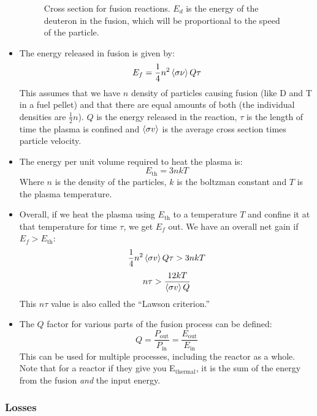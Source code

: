 \documentclass[letter]{article}
\begin{document}
\begin{itemize}
\begin{figure}[hbtp]
    \caption{Cross section for fusion
      reactions. $E_d$ is the energy of the deuteron in the fusion,
      which will be proportional to the speed of the particle.~\cite[pp. 532]{krane}}
    \label{fig:fusion_xsec}
  \end{figure}
\item The energy released in fusion is given by:
  \begin{equation*}
    E_f = \frac{1}{4}n^2\braket{\sigma\nu}Q\tau
  \end{equation*}
This assumes that we have $n$ density of particles causing fusion (like D
and T in a fuel pellet) and that there are equal amounts of both (the
individual densities are $\frac{1}{2}n$). $Q$ is the energy released
in the reaction, $\tau$ is the length of time the plasma is confined
and $\braket{\sigma{}v}$ is the average cross section times particle
velocity.~\cite[pp. 541]{krane}
\item The energy per unit volume required to heat the plasma is:
  \begin{equation*}
    E_{\text{th}} = 3nkT
  \end{equation*}
Where $n$ is the density of the particles, $k$ is the boltzman
constant and $T$ is the plasma temperature.~\cite[pp. 541]{krane}
\item Overall, if we heat the plasma using $E_{\text{th}}$ to a
  temperature $T$ and confine it at that temperature for time $\tau$,
  we get $E_f$ out. We have an overall net gain if $E_f >
  E_{\text{th}}$:
  \begin{equation*}
    \frac{1}{4}n^2\braket{\sigma{}v}Q\tau > 3nkT
  \end{equation*}
  \begin{equation*}
    n\tau > \frac{12kT}{\braket{\sigma{}v}Q}
  \end{equation*}
This $n\tau$ value is also called the ``Lawson criterion.''
\cite[pp. 541-542]{krane}
\item The $Q$ factor for various parts of the fusion process can be
  defined:
  \begin{equation*}
    Q = \frac{P_{\text{out}}}{P_{\text{in}}} = \frac{E_{\text{out}}}{E_{\text{in}}}
  \end{equation*}
This can be used for multiple processes, including the reactor as a
whole. Note that for a reactor if they give you E$_{\text{thermal}}$,
it is the sum of the energy from the fusion \textit{and} the input energy.
\end{itemize}

\subsubsection{Losses}
\end{document}
